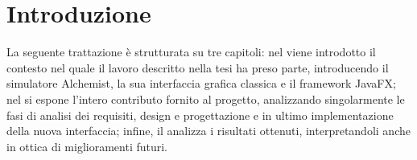 
\chapter{Introduzione}\label{ch:intro}

\medskip

La seguente trattazione è strutturata su tre capitoli: nel  viene introdotto il contesto nel quale il lavoro descritto nella tesi ha preso parte, introducendo il simulatore Alchemist, la sua interfaccia grafica classica e il framework JavaFX; nel  si espone l'intero contributo fornito al progetto, analizzando singolarmente le fasi di analisi dei requisiti, design e progettazione e in ultimo implementazione della nuova interfaccia; infine, il  analizza i risultati ottenuti, interpretandoli anche in ottica di miglioramenti futuri.
